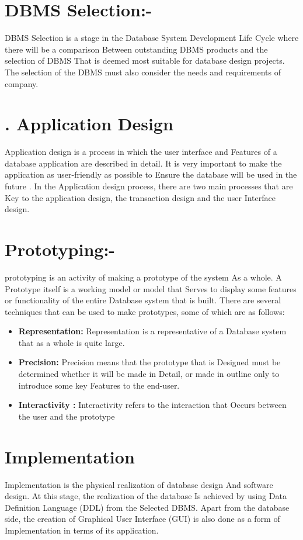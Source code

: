 \documentclass[12pt,a4paper]{article}
\begin{document}
\section*{DBMS Selection:-}DBMS Selection is a stage in the Database System Development Life Cycle where there will be a comparison Between outstanding DBMS products and the selection of DBMS That is deemed most suitable for database design projects. 
The selection of the DBMS must also consider the needs and requirements of company.
\section*{. Application Design}Application design is a process in which the user interface and Features of a database application are described in detail. It is very important to make the application as user-friendly as possible to Ensure the database will be used in the future .
In the Application design process, there are two main processes that are Key to the application design, the transaction design and the user 
Interface design.
\section*{Prototyping:-}prototyping is an activity of making a prototype of the system As a whole. A Prototype itself is a working model or model that Serves to display some features or functionality of the entire Database system that is built.  There are several techniques that can be used to make prototypes, some of which are as follows:
\begin{itemize}    
\item \textbf{Representation: }Representation is a representative of a Database system that as a whole is quite large. 
\item \textbf{Precision: }Precision means that the prototype that is 
Designed must be determined whether it will be made in Detail, or made in outline only to introduce some key 
Features to the end-user.
\item \textbf{Interactivity : }Interactivity refers to the interaction that 
Occurs between the user and the prototype
\end{itemize}
\section*{Implementation}Implementation is the physical realization of database design And software design. At this stage, the realization of the database Is achieved by using Data Definition Language (DDL) from the Selected DBMS. Apart from the database side, the creation of Graphical User Interface (GUI) is also done as a form of Implementation in terms of its application.
\end{document}
